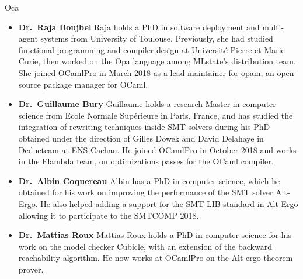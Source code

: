 \begin{sitedescription}{Oca}
\begin{itemize} %
  \item{\bf Dr.\ Raja Boujbel} Raja holds a PhD in software deployment and
    multi-agent systems from University of Toulouse. Previously, she had studied
    functional programming and compiler design at Université Pierre et Marie
    Curie, then worked on the Opa language among MLstate’s distribution team.
    She joined OCamlPro in March 2018 as a lead maintainer for opam, an
    open-source package manager for OCaml.
\item{\bf Dr.\ Guillaume Bury} Guillaume holds a research Master in computer
    science from Ecole Normale Supérieure in Paris, France, and has studied the
    integration of rewriting techniques inside SMT solvers during his PhD
    obtained under the direction of Gilles Dowek and David Delahaye in
    Deducteam at ENS Cachan. He joined OCamlPro in October 2018 and works in
    the Flambda team, on optimizations passes for the OCaml compiler.
\item{\bf Dr.\ Albin Coquereau} Albin has a PhD in computer science,
    which he obtained for his work on improving the performance of the SMT
    solver Alt-Ergo. He also helped adding a support for the SMT-LIB standard
    in Alt-Ergo allowing it to participate to the SMTCOMP 2018.
\item{\bf Dr.\ Mattias Roux} Mattias Roux holds a PhD in computer science
    for his work on the model checker Cubicle, with an extension of the backward
    reachability algorithm. He now works at OCamlPro on the Alt-ergo theorem
    prover.
\end{itemize}

\end{sitedescription}

